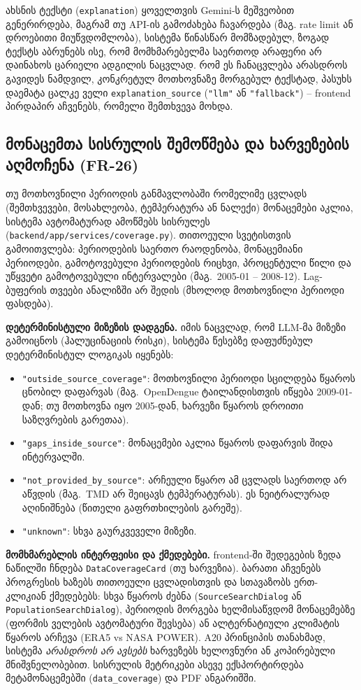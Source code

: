 \documentclass[11pt,a4paper]{article}
\begin{document}
ახსნის ტექსტი (\texttt{explanation}) ყოველთვის Gemini-ს მეშვეობით
გენერირდება, მაგრამ თუ API-ის გამოძახება ჩავარდება (მაგ. rate limit ან
დროებითი მიუწვდომლობა), სისტემა წინასწარ მომზადებულ, ზოგად ტექსტს
აბრუნებს ისე, რომ მომხმარებელმა საერთოდ არაფერი არ დაინახოს ცარიელი
ადგილის ნაცვლად. რომ ეს ჩანაცვლება არასდროს გავიდეს ნამდვილ,
კონკრეტულ მოთხოვნაზე მორგებულ ტექსტად, პასუხს დაემატა ცალკე ველი
\texttt{explanation\_source} (\texttt{"llm"} ან \texttt{"fallback"}) --
frontend პირდაპირ აჩვენებს, რომელი შემთხვევა მოხდა.

\subsection{მონაცემთა სისრულის შემოწმება და ხარვეზების აღმოჩენა (FR-26)}
თუ მოთხოვნილი პერიოდის განმავლობაში რომელიმე ცვლადს (შემთხვევები,
მოსახლეობა, ტემპერატურა ან ნალექი) მონაცემები აკლია, სისტემა ავტომატურად
ამოწმებს სისრულეს (\texttt{backend/app/services/coverage.py}). თითოეული
სვეტისთვის გამოითვლება: პერიოდების საერთო რაოდენობა, მონაცემიანი პერიოდები,
გამოტოვებული პერიოდების რიცხვი, პროცენტული წილი და უწყვეტი გამოტოვებული
ინტერვალები (მაგ.\ 2005-01 -- 2008-12). Lag-ბუფერის თვეები ანალიზში არ შედის
(მხოლოდ მოთხოვნილი პერიოდი ფასდება).

\textbf{დეტერმინისტული მიზეზის დადგენა.} იმის ნაცვლად, რომ LLM-მა
მიზეზი გამოიცნოს (ჰალუცინაციის რისკი), სისტემა წესებზე დაფუძნებულ
დეტერმინისტულ ლოგიკას იყენებს:
\begin{itemize}[leftmargin=1.4em]
  \item \texttt{"outside\_source\_coverage"}: მოთხოვნილი პერიოდი სცილდება
    წყაროს ცნობილ დაფარვას (მაგ.\ OpenDengue ტაილანდისთვის იწყება 2009-01-დან;
    თუ მოთხოვნა იყო 2005-დან, ხარვეზი წყაროს დროითი საზღვრების გარეთაა).
  \item \texttt{"gaps\_inside\_source"}: მონაცემები აკლია წყაროს დაფარვის
    შიდა ინტერვალში.
  \item \texttt{"not\_provided\_by\_source"}: არჩეული წყარო ამ ცვლადს
    საერთოდ არ აწვდის (მაგ.\ TMD არ შეიცავს ტემპერატურას). ეს ნეიტრალურად
    აღინიშნება (წითელი გაფრთხილების გარეშე).
  \item \texttt{"unknown"}: სხვა გაურკვეველი მიზეზი.
\end{itemize}

\textbf{მომხმარებლის ინტერფეისი და ქმედებები.} frontend-ში შედეგების
ზედა ნაწილში ჩნდება \texttt{DataCoverageCard} (თუ ხარვეზია). ბარათი
აჩვენებს პროგრესის ხაზებს თითოეული ცვლადისთვის და სთავაზობს ერთ-კლიკიან
ქმედებებს: სხვა წყაროს ძებნა (\texttt{SourceSearchDialog} ან
\texttt{PopulationSearchDialog}), პერიოდის მორგება ხელმისაწვდომ მონაცემებზე
(ფორმის ველების ავტომატური შევსება) ან ალტერნატიული კლიმატის წყაროს
არჩევა (ERA5 vs NASA POWER). A20 პრინციპის თანახმად, სისტემა
\emph{არასდროს არ ავსებს} ხარვეზებს ხელოვნური ან კოპირებული მნიშვნელობებით.
სისრულის მეტრიკები ასევე ექსპორტირდება მეტამონაცემებში (\texttt{data\_coverage})
და PDF ანგარიშში.
\end{document}
